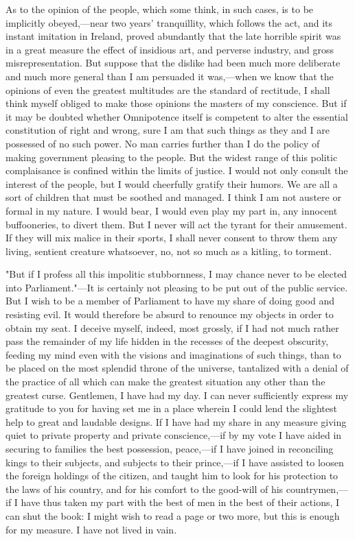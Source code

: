 As to the opinion of the people, which some think, in such cases, is to be implicitly obeyed,—near two years' tranquillity, which follows the act, and its instant imitation in Ireland, proved abundantly that the late horrible spirit was in a great measure the effect of insidious art, and perverse industry, and gross misrepresentation. But suppose that the dislike had been much more deliberate and much more general than I am persuaded it was,—when we know that the opinions of even the greatest multitudes are the standard of rectitude, I shall think myself obliged to make those opinions the masters of my conscience. But if it may be doubted whether Omnipotence itself is competent to alter the essential constitution of right and wrong, sure I am that such things as they and I are possessed of no such power. No man carries further than I do the policy of making government pleasing to the people. But the widest range of this politic complaisance is confined within the limits of justice. I would not only consult the interest of the people, but I would cheerfully gratify their humors. We are all a sort of children that must be soothed and managed. I think I am not austere or formal in my nature. I would bear, I would even play my part in, any innocent buffooneries, to divert them. But I never will act the tyrant for their amusement. If they will mix malice in their sports, I shall never consent to throw them any living, sentient creature whatsoever, no, not so much as a kitling, to torment.

"But if I profess all this impolitic stubbornness, I may chance never to be elected into Parliament."—It is certainly not pleasing to be put out of the public service. But I wish to be a member of Parliament to have my share of doing good and resisting evil. It would therefore be absurd to renounce my objects in order to obtain my seat. I deceive myself, indeed, most grossly, if I had not much rather pass the remainder of my life hidden in the recesses of the deepest obscurity, feeding my mind even with the visions and imaginations of such things, than to be placed on the most splendid throne of the universe, tantalized with a denial of the practice of all which can make the greatest situation any other than the greatest curse. Gentlemen, I have had my day. I can never sufficiently express my gratitude to you for having set me in a place wherein I could lend the slightest help to great and laudable designs. If I have had my share in any measure giving quiet to private property and private conscience,—if by my vote I have aided in securing to families the best possession, peace,—if I have joined in reconciling kings to their subjects, and subjects to their prince,—if I have assisted to loosen the foreign holdings of the citizen, and taught him to look for his protection to the laws of his country, and for his comfort to the good-will of his countrymen,—if I have thus taken my part with the best of men in the best of their actions, I can shut the book: I might wish to read a page or two more, but this is enough for my measure. I have not lived in vain.

